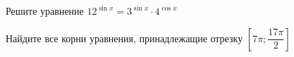 \begin{ex}
	\begin{condition}
		\begin{enumcols}[label=\asbuk*)]
			\item Решите уравнение \( 12^{\sin x} = 3^{\sin x}\cdot4^{\cos x} \)
			\item Найдите все корни уравнения, принадлежащие отрезку \( \left[7\pi;\dfrac{17\pi}{2}\right] \)
		\end{enumcols}
	\end{condition}
\end{ex}